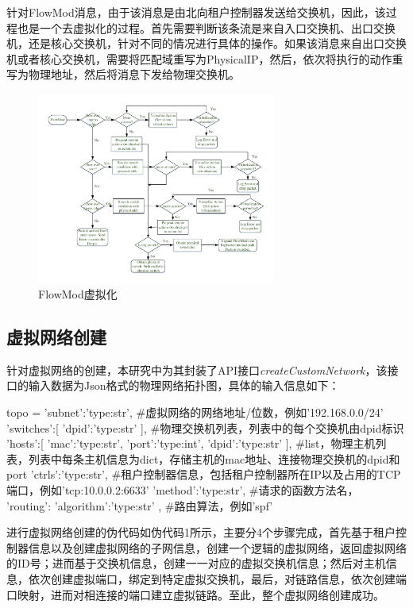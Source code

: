 针对FlowMod消息，由于该消息是由北向租户控制器发送给交换机，因此，该过程也是一个去虚拟化的过程。首先需要判断该条流是来自入口交换机、出口交换机，还是核心交换机，针对不同的情况进行具体的操作。如果该消息来自出口交换机或者核心交换机，需要将匹配域重写为PhysicalIP，然后，依次将执行的动作重写为物理地址，然后将消息下发给物理交换机。

\begin{figure}[!htb]
  \centering
  \includegraphics[width=0.7\textwidth]{logo/FlowMod}
  \caption{FlowMod虚拟化}
  \label{fig:flowmod}
\end{figure}
\subsection{虚拟网络创建}
针对虚拟网络的创建，本研究中为其封装了API接口\emph{createCustomNetwork}，该接口的输入数据为Json格式的物理网络拓扑图，具体的输入信息如下：

\begin{python} 
topo = {
	'subnet':'type:str', #虚拟网络的网络地址/位数，例如'192.168.0.0/24'
	'switches':[
		{
			'dpid':'type:str'
		}
	], #物理交换机列表，列表中的每个交换机由dpid标识
	'hosts':[
		{
			'mac':'type:str',
			'port':'type:int',
			'dpid':'type:str'
		}
	], #list，物理主机列表，列表中每条主机信息为dict，存储主机的mac地址、连接物理交换机的dpid和port
	'ctrls':'type:str', #租户控制器信息，包括租户控制器所在IP以及占用的TCP端口，例如'tcp:10.0.0.2:6633'
	'method':'type:str', #请求的函数方法名，
	'routing':{
		'algorithm':'type:str'
	}, #路由算法，例如'spf'
}
\end{python}

进行虚拟网络创建的伪代码如伪代码1所示，主要分4个步骤完成，首先基于租户控制器信息以及创建虚拟网络的子网信息，创建一个逻辑的虚拟网络，返回虚拟网络的ID号；进而基于交换机信息，创建一一对应的虚拟交换机信息；然后对主机信息，依次创建虚拟端口，绑定到特定虚拟交换机，最后，对链路信息，依次创建端口映射，进而对相连接的端口建立虚拟链路。至此，整个虚拟网络创建成功。

